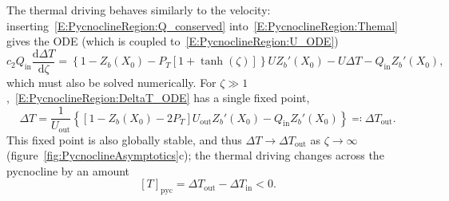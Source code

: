 \documentclass[openacc]{rsproca_new}%
\newcommand{\dd}[2]{\frac{\mathrm{d} #1}{\mathrm{d} #2}}
\newcommand{\Pt}{\textit{P}_T}
\newcommand{\ctwo}{c_2}  %
\renewcommand{\in}{\text{in}} %
\newcommand{\out}{\text{out}}
\begin{document}
The thermal driving behaves similarly to the velocity: inserting~\eqref{E:PycnoclineRegion:Q_conserved} into~\eqref{E:PycnoclineRegion:Themal} gives the ODE (which is coupled to~\eqref{E:PycnoclineRegion:U_ODE})
\begin{equation}\label{E:PycnoclineRegion:DeltaT_ODE}
\ctwo Q_\in \dd{\Delta T}{\zeta} = \left\{1 - Z_b(X_0) - \Pt\left[1 + \tanh(\zeta)\right]\right\}UZ_b'(X_0) - U\Delta T - Q_\in Z_b'(X_0), 
\end{equation}
which must also be solved numerically. For $\zeta \gg 1$,~\eqref{E:PycnoclineRegion:DeltaT_ODE} has a single fixed point,
\begin{equation}\label{E:PycnoclineRegion:DeltaT_Limit}
\Delta T = \frac{1}{U_\out}\left\{\left[1 - Z_b(X_0) - 2\Pt\right]U_\out Z_b'(X_0) - Q_\in Z_b'(X_0)\right\} \eqcolon \Delta T_\out.
\end{equation}
This fixed point is also globally stable, and thus $\Delta T \to \Delta T_\out$ as $\zeta \to \infty$ (figure~\ref{fig:PycnoclineAsymptotics}c); the thermal driving changes across the pycnocline by an amount 
\begin{equation}\label{E:PycnoclineRegion:DeltaT_change}
\left[T\right]_{\text{pyc}} = \Delta T_\out - \Delta T_\in < 0.
\end{equation} 
\end{document}

